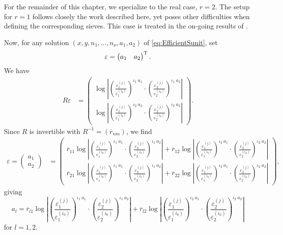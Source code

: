 For the remainder of this chapter, we specialize to the real case, $r = 2$. The setup for $r = 1$ follows closely the work described here, yet poses other difficulties when defining the corresponding sieves. This case is treated in the on-going results of \cite{GhKaMaSi}. 

Now, for any solution $(x,y, n_1, \dots, n_{\nu}, a_1, a_2)$ of \eqref{eq:EfficientSunit}, set
\[\mathbf{\varepsilon} = \begin{pmatrix} a_1 & a_2 \end{pmatrix}^{\text{T}}.\]
We have 
\begin{align*}
R{\varepsilon}
	& = \begin{pmatrix} 
		\log\left|\left(\frac{\varepsilon_1^{(j)}}{\varepsilon_1^{(i_0)}}\right)^{\iota_1 \ a_1} \cdot 
		 \left(\frac{\varepsilon_2^{(j)}}{\varepsilon_2^{(i_0)}}\right)^{\iota_1 \ a_2}\right| \\ 
		\log\left|\left(\frac{\varepsilon_1^{(j)}}{\varepsilon_1^{(i_0)}}\right)^{\iota_2\ a_2} \cdot 
		 \left(\frac{\varepsilon_2^{(j)}}{\varepsilon_2^{(i_0)}}\right)^{\iota_2 \ a_2}\right|
		 \end{pmatrix}.
\end{align*}
Since $R$ is invertible with $R^{-1} = (\overline{r}_{nm})$, we find
\begin{align*}
{\varepsilon} = \begin{pmatrix} a_1 \\ a_2 \end{pmatrix} 
	& = \begin{pmatrix} 
		\overline{r}_{11}\log\left|\left(\frac{\varepsilon_1^{(j)}}{\varepsilon_1^{(i_0)}}\right)^{\iota_1 \ a_1} 		\cdot \left(\frac{\varepsilon_2^{(j)}}{\varepsilon_2^{(i_0)}}\right)^{\iota_1 \ a_2}\right| + 
		\overline{r}_{12}\log\left|\left(\frac{\varepsilon_1^{(j)}}{\varepsilon_1^{(i_0)}}\right)^{\iota_2\ a_1}
		\cdot \left(\frac{\varepsilon_2^{(j)}}{\varepsilon_2^{(i_0)}}\right)^{\iota_2 \ a_2}\right| \\
		\overline{r}_{21}\log\left|\left(\frac{\varepsilon_1^{(j)}}{\varepsilon_1^{(i_0)}}\right)^{\iota_1 \ a_1} 		\cdot \left(\frac{\varepsilon_2^{(j)}}{\varepsilon_2^{(i_0)}}\right)^{\iota_1 \ a_2}\right| +
		\overline{r}_{22}\log\left|\left(\frac{\varepsilon_1^{(j)}}{\varepsilon_1^{(i_0)}}\right)^{\iota_2\ a_1}
		\cdot \left(\frac{\varepsilon_2^{(j)}}{\varepsilon_2^{(i_0)}}\right)^{\iota_2 \ a_2}\right|
		\end{pmatrix},
\end{align*}
giving
\[a_l = \overline{r}_{l1}\log\left|\left(\frac{\varepsilon_1^{(j)}}{\varepsilon_1^{(i_0)}}\right)^{\iota_1 \ a_1} 		\cdot \left(\frac{\varepsilon_2^{(j)}}{\varepsilon_2^{(i_0)}}\right)^{\iota_1 \ a_2}\right| + 
	\overline{r}_{l2}\log\left|\left(\frac{\varepsilon_1^{(j)}}{\varepsilon_1^{(i_0)}}\right)^{\iota_2\ a_1}
	\cdot \left(\frac{\varepsilon_2^{(j)}}{\varepsilon_2^{(i_0)}}\right)^{\iota_2 \ a_2}\right|\]
for $l = 1,2$. 

